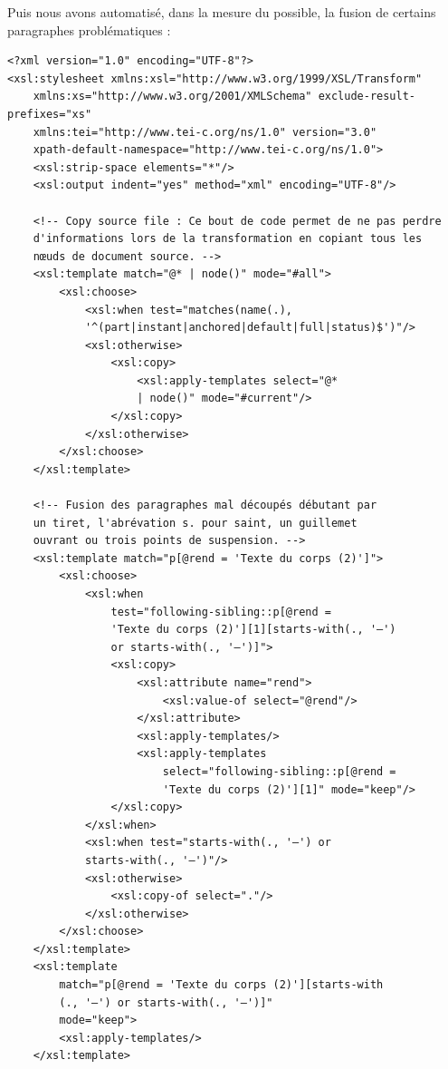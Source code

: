 \documentclass[a4paper,12pt,twoside]{book}
\begin{document}
    Puis nous avons automatisé, dans la mesure du possible, la fusion de certains paragraphes problématiques : 
    
    \begin{verbatim}
<?xml version="1.0" encoding="UTF-8"?>
<xsl:stylesheet xmlns:xsl="http://www.w3.org/1999/XSL/Transform"
    xmlns:xs="http://www.w3.org/2001/XMLSchema" exclude-result-prefixes="xs"
    xmlns:tei="http://www.tei-c.org/ns/1.0" version="3.0"
    xpath-default-namespace="http://www.tei-c.org/ns/1.0">
    <xsl:strip-space elements="*"/>
    <xsl:output indent="yes" method="xml" encoding="UTF-8"/>

    <!-- Copy source file : Ce bout de code permet de ne pas perdre 
    d'informations lors de la transformation en copiant tous les 
    nœuds de document source. -->
    <xsl:template match="@* | node()" mode="#all">
        <xsl:choose>
            <xsl:when test="matches(name(.), 
            '^(part|instant|anchored|default|full|status)$')"/>
            <xsl:otherwise>
                <xsl:copy>
                    <xsl:apply-templates select="@* 
                    | node()" mode="#current"/>
                </xsl:copy>
            </xsl:otherwise>
        </xsl:choose>
    </xsl:template>

    <!-- Fusion des paragraphes mal découpés débutant par 
    un tiret, l'abrévation s. pour saint, un guillemet 
    ouvrant ou trois points de suspension. -->
    <xsl:template match="p[@rend = 'Texte du corps (2)']">
        <xsl:choose>
            <xsl:when
                test="following-sibling::p[@rend = 
                'Texte du corps (2)'][1][starts-with(., '—') 
                or starts-with(., '—')]">
                <xsl:copy>
                    <xsl:attribute name="rend">
                        <xsl:value-of select="@rend"/>
                    </xsl:attribute>
                    <xsl:apply-templates/>
                    <xsl:apply-templates
                        select="following-sibling::p[@rend = 
                        'Texte du corps (2)'][1]" mode="keep"/>
                </xsl:copy>
            </xsl:when>
            <xsl:when test="starts-with(., '—') or 
            starts-with(., '—')"/>
            <xsl:otherwise>
                <xsl:copy-of select="."/>
            </xsl:otherwise>
        </xsl:choose>
    </xsl:template>
    <xsl:template
        match="p[@rend = 'Texte du corps (2)'][starts-with
        (., '—') or starts-with(., '—')]"
        mode="keep">
        <xsl:apply-templates/>
    </xsl:template>


\end{verbatim}
\end{document}
